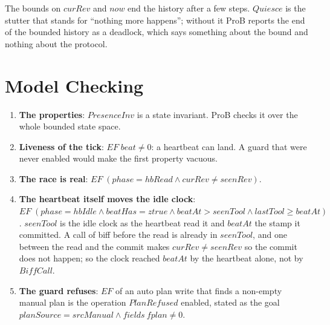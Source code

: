 \documentclass[a4paper,10pt,fleqn]{article}
\begin{document}
The bounds on $curRev$ and $now$ end the history after a few steps.  $Quiesce$
is the stutter that stands for ``nothing more happens''; without it ProB
reports the end of the bounded history as a deadlock, which says something
about the bound and nothing about the protocol.

\section{Model Checking}

\begin{enumerate}
  \item \textbf{The properties}: $PresenceInv$ is a state invariant.  ProB checks
    it over the whole bounded state space.
  \item \textbf{Liveness of the tick}: $EF\; beat \neq 0$: a heartbeat can
    land.  A guard that were never enabled would make the first property
    vacuous.
  \item \textbf{The race is real}: $EF\;(phase = hbRead \land curRev \neq
    seenRev)$.
  \item \textbf{The heartbeat itself moves the idle clock}: $EF\;(phase =
    hbIdle \land beatHas = ztrue \land beatAt > seenTool \land lastTool \geq
    beatAt)$.  $seenTool$ is the idle clock as the heartbeat read it and $beatAt$
    the stamp it committed.  A call of biff before the read is already in
    $seenTool$, and one between the read and the commit makes $curRev \neq
    seenRev$ so the commit does not happen; so the clock reached $beatAt$ by the
    heartbeat alone, not by $BiffCall$.
  \item \textbf{The guard refuses}: $EF$ of an auto plan write that finds a
    non-empty manual plan is the operation $PlanRefused$ enabled, stated as the
    goal $planSource = srcManual \land fields~fplan \neq 0$.
\end{enumerate}
\end{document}
